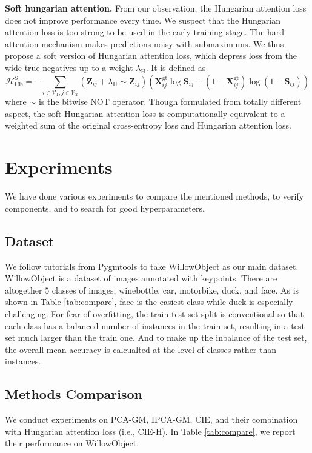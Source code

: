 \documentclass[a4paper]{article}
\begin{document}
\textbf{Soft hungarian attention.} From our observation, the Hungarian attention loss does not improve performance every time. We suspect that the Hungarian attention loss is too strong to be used in the early training stage. The hard attention mechanism makes predictions noisy with submaximums. We thus propose a soft version of Hungarian attention loss, which depress loss from the wide true negatives up to a weight $\lambda_{\mathrm{H}}$. It is defined as
$$
\mathcal{H}_{\mathrm{CE}}^\mathrm{S} = -\sum_{i\in \mathcal{V}_1, j\in \mathcal{V}_2 } \left(\mathbf{Z}_{ij} + \lambda_{\mathrm{H}} \sim \mathbf{Z}_{ij}\right) \left(\mathbf{X}_{ij}^{\mathrm{gt}} \log\mathbf{S}_{ij} + \left(1-\mathbf{X}_{ij}^{\mathrm{gt}}\right) \log \left(1- \mathbf{S}_{ij}\right) \right)
$$
where $\sim$ is the bitwise NOT operator. Though formulated from totally different aspect, the soft Hungarian attention loss is computationally equivalent to a weighted sum of the original cross-entropy loss and Hungarian attention loss.

\section{Experiments}
We have done various experiments to compare the mentioned methods, to verify components, and to search for good hyperparameters. 

\subsection{Dataset}
We follow tutorials from Pygmtools \cite{pygmtools} to take WillowObject \cite{willow} as our main dataset. WillowObject is a dataset of images annotated with keypoints. There are altogether $5$ classes of images, winebottle, car, motorbike, duck, and face. As is shown in Table \ref{tab:compare}, face is the easiest class while duck is especially challenging. For fear of overfitting, the train-test set split is conventional so that each class has a balanced number of instances in the train set, resulting in a test set much larger than the train one. And to make up the inbalance of the test set, the overall mean accuracy is calcualted at the level of classes rather than instances.

\subsection{Methods Comparison}
We conduct experiments on PCA-GM, IPCA-GM, CIE, and their combination with Hungarian attention loss (i.e., CIE-H). In Table \ref{tab:compare}, we report their performance on WillowObject.
\end{document}
